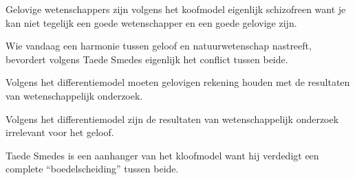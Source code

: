 \documentclass[main.tex]{subfiles}
\begin{document}
\begin{examenvraag}
    \begin{stelling}
        Gelovige wetenschappers zijn volgens het koofmodel eigenlijk schizofreen want je kan niet tegelijk een goede wetenschapper en een goede gelovige zijn.
    \end{stelling}

    \begin{antwoord}
    \end{antwoord}
\end{examenvraag}


\begin{examenvraag}
    \begin{stelling}
        Wie vandaag een harmonie tussen geloof en natuurwetenschap nastreeft, bevordert volgens Taede Smedes eigenlijk het conflict tussen beide.
    \end{stelling}

    \begin{antwoord}
    \end{antwoord}
\end{examenvraag}


\begin{examenvraag}
    \begin{stelling}
        Volgens het differentiemodel moeten gelovigen rekening houden met de resultaten van wetenschappelijk onderzoek.
    \end{stelling}

    \begin{antwoord}
    \end{antwoord}
\end{examenvraag}


\begin{examenvraag}
    \begin{stelling}
        Volgens het differentiemodel zijn de resultaten van wetenschappelijk onderzoek irrelevant voor het geloof.
    \end{stelling}

    \begin{antwoord}
    \end{antwoord}
\end{examenvraag}


\begin{examenvraag}
    \begin{stelling}
        Taede Smedes is een aanhanger van het kloofmodel want hij verdedigt een complete “boedelscheiding” tussen beide.
    \end{stelling}

    \begin{antwoord}
    \end{antwoord}
\end{examenvraag}
\end{document}
